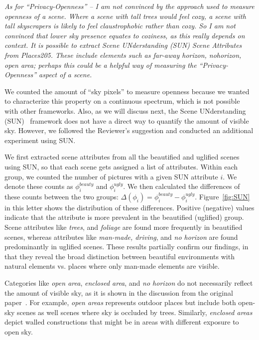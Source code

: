 \documentclass{paper}
\newenvironment{myquote}
{\definecolor{shadecolor}{rgb}{0.9,0.95,1} \begin{shaded*} \sf \em}
{\em\end{shaded*}}
\begin{document}


\begin{myquote}
    As for ``Privacy-Openness'' – I am not convinced by the approach used to measure openness of a scene. Where a scene with tall trees would feel cozy, a scene with tall skyscrapers is likely to feel claustrophobic rather than cozy. So I am not convinced that lower sky presence equates to coziness, as this really depends on context. It is possible to extract Scene UNderstanding (SUN) Scene Attributes from Places205. These include elements such as far-away horizon, nohorizon, open area; perhaps this could be a helpful way of measuring the ``Privacy-Openness'' aspect of a scene. 
\end{myquote}

\noindent We counted the amount of ``sky pixels'' to measure openness because we wanted to characterize this property on a continuous spectrum, which is not possible with other frameworks. Also, as we will discuss next, the Scene UNderstanding (SUN)~\cite{patterson2012sun,zhou2016places} framework does not have a direct way to quantify the amount of visible sky. However, we followed the Reviewer's suggestion and conducted an additional experiment using SUN.

\noindent We first extracted scene attributes from all the beautified and uglified scenes using SUN, so that each scene gets assigned a list of attributes. Within each group, we counted the number of pictures with a given SUN attribute $i$. We denote these counts as $\phi_i^{beauty}$ and $\phi_i^{ugly}$. We then calculated the differences of these counts between the two groups: $\Delta(\phi_i) = \phi_i^{beauty} - \phi_i^{ugly}$. Figure~\ref{fig:SUN} in this letter shows the distribution of these differences. Positive (negative) values indicate that the attribute is more prevalent in the beautified (uglified) group. Scene attributes like \textit{trees}, and \textit{foliage} are found more frequently in beautified scenes, whereas attributes like \textit{man-made, driving}, and \textit{no horizon} are found predominantly in uglified scenes. These results partially confirm our findings, in that they reveal the broad distinction between beautiful environments with natural elements vs. places where only man-made elements are visible. 

\noindent Categories like \textit{open area}, \textit{enclosed area}, and \textit{no horizon} do not necessarily reflect the amount of visible sky, as it is shown in the discussion from the original paper~\cite{patterson2012sun}. For example, \textit{open areas} represents outdoor places but include both open-sky scenes as well scenes where sky is occluded by trees. Similarly, \textit{enclosed areas} depict walled constructions that might be in areas with different exposure to open sky.
\end{document}

